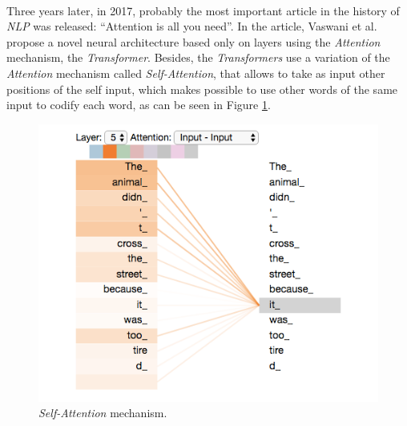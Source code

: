 \paragraph{}
Three years later, in 2017, probably the most important article in the history of \emph{NLP} was released: ``Attention is all you need''.\cite{Vaswani2017} In the article, Vaswani et al. propose a novel neural architecture based only on layers using the \emph{Attention} mechanism, the \emph{Transformer}. Besides, the \emph{Transformers} use a variation of the \emph{Attention} mechanism called \emph{Self-Attention}, that allows to take as input other positions of the self input, which makes possible to use other words of the same input to codify each word, as can be seen in Figure \ref{fig:selfattention}.
\begin{figure}[h!]
	\centering
	\includegraphics[scale=0.45]{images/selfattention}
	\caption{\emph{Self-Attention} mechanism.}
	\label{fig:selfattention}
\end{figure}
